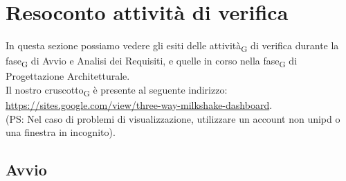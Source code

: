 
\section{Resoconto {attività} di verifica}
In questa sezione possiamo vedere gli esiti delle attività\textsubscript{G} di verifica durante la fase\textsubscript{G} di Avvio e Analisi dei Requisiti, e quelle in corso nella fase\textsubscript{G} di Progettazione Architetturale.\\
Il nostro cruscotto\textsubscript{G} è presente al seguente indirizzo:\\ \url{https://sites.google.com/view/three-way-milkshake-dashboard}.\\ (PS: Nel caso di problemi di visualizzazione, utilizzare un account non unipd o una finestra in incognito).
\subsection{Avvio}
